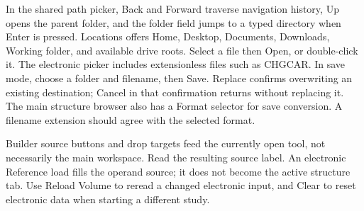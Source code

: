 In the shared path picker, Back and Forward traverse navigation history, Up opens the parent folder, and the folder field jumps to a typed directory when Enter is pressed. Locations offers Home, Desktop, Documents, Downloads, Working folder, and available drive roots. Select a file then Open, or double-click it. The electronic picker includes extensionless files such as CHGCAR. In save mode, choose a folder and filename, then Save. Replace confirms overwriting an existing destination; Cancel in that confirmation returns without replacing it. The main structure browser also has a Format selector for save conversion. A filename extension should agree with the selected format.

Builder source buttons and drop targets feed the currently open tool, not necessarily the main workspace. Read the resulting source label. An electronic Reference load fills the operand source; it does not become the active structure tab. Use Reload Volume to reread a changed electronic input, and Clear to reset electronic data when starting a different study.


